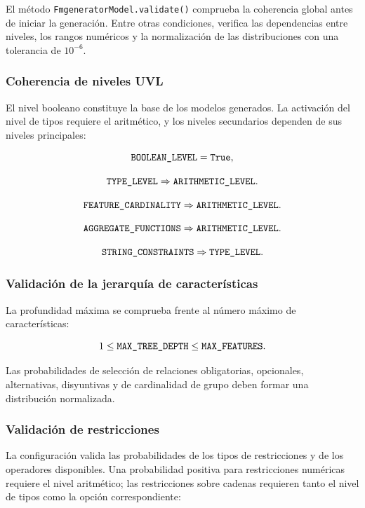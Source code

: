 El método \texttt{FmgeneratorModel.validate()} comprueba la coherencia global
antes de iniciar la generación. Entre otras condiciones, verifica las
dependencias entre niveles, los rangos numéricos y la normalización de las
distribuciones con una tolerancia de $10^{-6}$.

\subsubsection*{Coherencia de niveles UVL}

El nivel booleano constituye la base de los modelos generados. La activación
del nivel de tipos requiere el aritmético, y los niveles secundarios dependen
de sus niveles principales:

\[
\text{\texttt{BOOLEAN\_LEVEL}}=\text{\texttt{True}},
\]

\[
\text{\texttt{TYPE\_LEVEL}}
\Rightarrow\text{\texttt{ARITHMETIC\_LEVEL}}.
\]

\[
\text{\texttt{FEATURE\_CARDINALITY}}
\Rightarrow\text{\texttt{ARITHMETIC\_LEVEL}}.
\]

\[
\text{\texttt{AGGREGATE\_FUNCTIONS}}
\Rightarrow\text{\texttt{ARITHMETIC\_LEVEL}}.
\]

\[
\text{\texttt{STRING\_CONSTRAINTS}}
\Rightarrow\text{\texttt{TYPE\_LEVEL}}.
\]

\subsubsection*{Validación de la jerarquía de características}

La profundidad máxima se comprueba frente al número máximo de
características:

\[
1\leq\text{\texttt{MAX\_TREE\_DEPTH}}
\leq\text{\texttt{MAX\_FEATURES}}.
\]

Las probabilidades de selección de relaciones obligatorias, opcionales,
alternativas, disyuntivas y de cardinalidad de grupo deben formar una
distribución normalizada.

\subsubsection*{Validación de restricciones}

La configuración valida las probabilidades de los tipos de restricciones y
de los operadores disponibles. Una probabilidad positiva para restricciones
numéricas requiere el nivel aritmético; las restricciones sobre cadenas
requieren tanto el nivel de tipos como la opción correspondiente:


